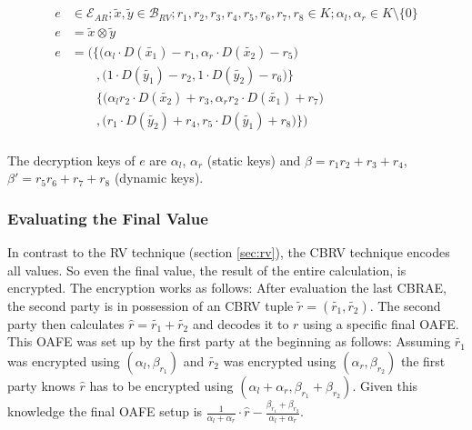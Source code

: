 \documentclass[12pt, a4paper]{article}
\begin{document}
\begin{align*}
  e & \in \mathcal{E}_{AR}; \widetilde{x}, \widetilde{y} \in \mathcal{B}_{RV};
  r_1, r_2, r_3, r_4, r_5, r_6, r_7, r_8 \in K;
  \alpha_l, \alpha_r \in K \setminus \{0\} \\
  e & = \widetilde{x} \otimes \widetilde{y} \\
  e & = \Bigg(\Big\{\big( \alpha_l \cdot D(\widetilde{x_1}) - r_1,
                          \alpha_r \cdot D(\widetilde{x_2}) -r_5 \big) \\
    &\qquad ,     \big(   1        \cdot D(\widetilde{y_1}) - r_2,
                          1        \cdot D(\widetilde{y_2}) - r_6 \big) \Big\}\\
    &\qquad   \Big\{\big( \alpha_lr_2 \cdot D(\widetilde{x_2}) + r_3,
                          \alpha_rr_2 \cdot D(\widetilde{x_1}) + r_7 \big) \\
    &\qquad ,       \big ( r_1        \cdot D(\widetilde{y_2}) + r_4,
                           r_5        \cdot D(\widetilde{y_1}) + r_8 \big)
              \Big\}\Bigg) \\
\end{align*}

The decryption keys of $e$ are $\alpha_l$, $\alpha_r$ (static keys) and
$\beta = r_1r_2 + r_3 + r_4$, $\beta' = r_5r_6 + r_7 + r_8$ (dynamic keys).


\subsubsection{Evaluating the Final Value}
\label{sec:eval-final-value}

In contrast to the RV technique (section \ref{sec:rv}), the
CBRV technique encodes all values. So even the final value, the result of the
entire calculation, is encrypted. The encryption works as follows: After
evaluation the last CBRAE, the second party is in possession of an CBRV tuple
$\widetilde{r} = (\widetilde{r_1}, \widetilde{r_2})$. The second party then
calculates $\widehat{r} = \widetilde{r_1} + \widetilde{r_2}$ and decodes it to
$r$ using a specific final OAFE. This OAFE was set up by the first party at the
beginning as follows: Assuming $\widetilde{r_1}$ was encrypted using $(\alpha_l,
\beta_{r_1})$ and $\widetilde{r_2}$ was encrypted using $(\alpha_r,
\beta_{r_2})$ the first party knows $\widehat{r}$ has to be encrypted using
$(\alpha_l + \alpha_r, \beta_{r_1} + \beta_{r_2})$. Given this knowledge the
final OAFE setup is $\frac{1}{\alpha_l + \alpha_r} \cdot \widehat{r} -
\frac{\beta_{r_1} + \beta_{r_2}}{\alpha_l + \alpha_r}$.
\end{document}

